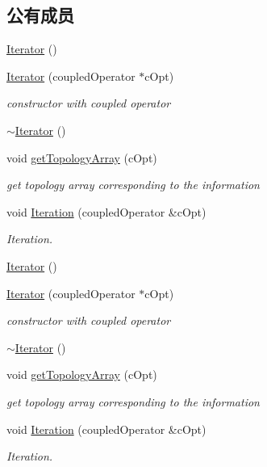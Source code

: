 \subsection*{公有成员}
\begin{DoxyCompactItemize}
\item 
\hyperlink{classIterator_a30f4489aebb0ea1a56da6925d03eecfb}{Iterator} ()
\item 
\hyperlink{classIterator_aef11e42fab332c1ef29187d4c7ab2b6c}{Iterator} (coupledOperator $\ast$cOpt)
\begin{DoxyCompactList}\small\item\em constructor with coupled operator \item\end{DoxyCompactList}\item 
\hyperlink{classIterator_aab6716f5bdecb49e9cdd754359408ab6}{$\sim$Iterator} ()
\item 
void \hyperlink{classIterator_a51e761bd6eb92e306b30e1c1baadb394}{getTopologyArray} (cOpt)
\begin{DoxyCompactList}\small\item\em get topology array corresponding to the information \item\end{DoxyCompactList}\item 
void \hyperlink{classIterator_a6f5264776582089c8507dc3fc03a6113}{Iteration} (coupledOperator \&cOpt)
\begin{DoxyCompactList}\small\item\em Iteration. \item\end{DoxyCompactList}\item 
\hyperlink{classIterator_a30f4489aebb0ea1a56da6925d03eecfb}{Iterator} ()
\item 
\hyperlink{classIterator_aef11e42fab332c1ef29187d4c7ab2b6c}{Iterator} (coupledOperator $\ast$cOpt)
\begin{DoxyCompactList}\small\item\em constructor with coupled operator \item\end{DoxyCompactList}\item 
\hyperlink{classIterator_aab6716f5bdecb49e9cdd754359408ab6}{$\sim$Iterator} ()
\item 
void \hyperlink{classIterator_a51e761bd6eb92e306b30e1c1baadb394}{getTopologyArray} (cOpt)
\begin{DoxyCompactList}\small\item\em get topology array corresponding to the information \item\end{DoxyCompactList}\item 
void \hyperlink{classIterator_a6f5264776582089c8507dc3fc03a6113}{Iteration} (coupledOperator \&cOpt)
\begin{DoxyCompactList}\small\item\em Iteration. \item\end{DoxyCompactList}\end{DoxyCompactItemize}


